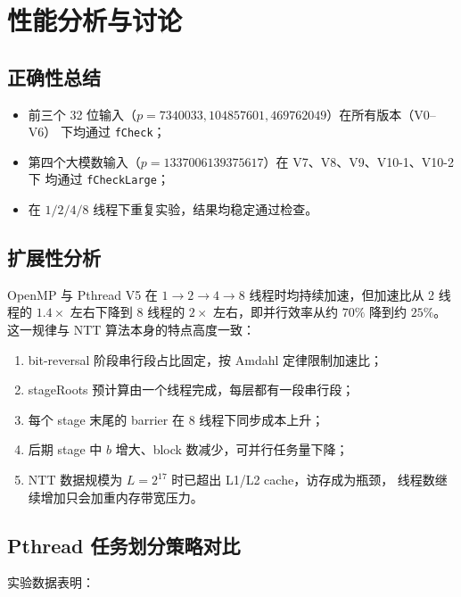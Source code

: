 \documentclass[UTF8,a4paper,10pt]{ctexart}
\begin{document}
\section{性能分析与讨论}

\subsection{正确性总结}

\begin{itemize}
  \item 前三个 32 位输入（$p = 7340033, 104857601, 469762049$）在所有版本（V0--V6）
        下均通过 \texttt{fCheck}；
  \item 第四个大模数输入（$p = 1337006139375617$）在 V7、V8、V9、V10-1、V10-2 下
        均通过 \texttt{fCheckLarge}；
  \item 在 $1/2/4/8$ 线程下重复实验，结果均稳定通过检查。
\end{itemize}

\subsection{扩展性分析}

OpenMP 与 Pthread V5 在 $1 \to 2 \to 4 \to 8$ 线程时均持续加速，但加速比从 2 线程的
$1.4\times$ 左右下降到 8 线程的 $2\times$ 左右，即并行效率从约 $70\%$ 降到约 $25\%$。
这一规律与 NTT 算法本身的特点高度一致：

\begin{enumerate}
  \item bit-reversal 阶段串行段占比固定，按 Amdahl 定律限制加速比；
  \item stageRoots 预计算由一个线程完成，每层都有一段串行段；
  \item 每个 stage 末尾的 barrier 在 8 线程下同步成本上升；
  \item 后期 stage 中 $b$ 增大、block 数减少，可并行任务量下降；
  \item NTT 数据规模为 $L = 2^{17}$ 时已超出 L1/L2 cache，访存成为瓶颈，
        线程数继续增加只会加重内存带宽压力。
\end{enumerate}

\subsection{Pthread 任务划分策略对比}

实验数据表明：
\end{document}
